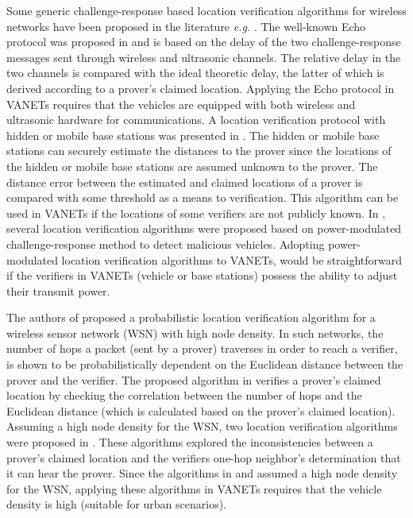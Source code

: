 \documentclass[journal]{IEEEtran}
\begin{document}
Some generic challenge-response based location verification algorithms for wireless networks have been proposed in the literature \emph{e.g.} \cite{sastry2003secure,capkun2008secure,zhang2008evaluation}.
The well-known Echo protocol was proposed in \cite{sastry2003secure} and is based on the delay of the two challenge-response messages sent through wireless and ultrasonic channels. The relative delay in the two channels is compared with the ideal theoretic delay, the latter of which  is derived according to a prover's claimed location. Applying the Echo protocol in VANETs requires that the vehicles are equipped with both wireless and ultrasonic hardware for communications.
A location verification protocol with hidden or mobile base stations was presented in \cite{capkun2008secure}. The hidden or mobile base stations can securely estimate the distances to the prover since the locations of the hidden or mobile base stations are assumed unknown to the prover. The distance error between the estimated and claimed locations of a prover is compared with some threshold as a means to verification. This algorithm can be used in VANETs if the locations of some verifiers are not publicly known. In \cite{zhang2008evaluation}, several location verification algorithms were proposed based on power-modulated challenge-response method to detect malicious vehicles. Adopting  power-modulated location verification algorithms to VANETs, would be straightforward if the verifiers in VANETs (vehicle or base stations) possess the ability to adjust their transmit power.

The authors of \cite{ekici2008secure} proposed a probabilistic location verification algorithm for a wireless sensor network (WSN) with high node density. In such networks, the number of hops a packet (sent by a prover) traverses in order to reach a verifier, is shown to be probabilistically dependent on the Euclidean distance between the prover and the verifier. The proposed algorithm in  \cite{ekici2008secure}  verifies a prover's claimed location by checking the correlation between the number of hops and the Euclidean distance (which is calculated based on the prover's claimed location). Assuming a high node density  for the WSN, two location verification algorithms were proposed in \cite{wei2012lightweight}. These algorithms explored the inconsistencies between a prover's claimed location and the verifiers one-hop neighbor's determination that it can hear the prover. Since the algorithms in \cite{ekici2008secure} and \cite{wei2012lightweight}  assumed a high node density for the WSN, applying these algorithms in VANETs requires that the vehicle density is high (suitable for urban scenarios).
\end{document}
